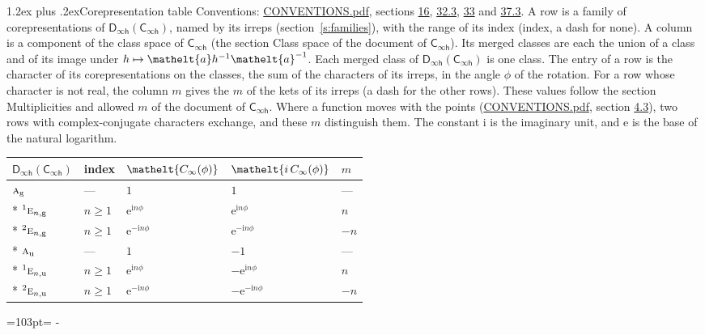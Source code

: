 \documentclass[10pt,a4paper]{article}
\makeatletter
\renewcommand\section{\@startsection{section}{1}{\z@}{-3ex plus -1ex minus -.2ex}%
  {1.2ex plus .2ex}{\normalfont\large\sffamily\bfseries\color{parttitle}}}
\newcommand{\needspace}[1]{\par\penalty-100\begingroup\dimen0=#1\relax\dimen2=\pagegoal
  \advance\dimen2-\pagetotal\ifdim\dimen0>\dimen2\relax\ifdim\dimen2>0pt\vfil\break\fi\fi
  \endgroup}
\numberwithin{equation}{section}
\newcommand{\eltfont}[1]{{\let\sigma\eltsigma\mathelt{#1}}}
\newcommand{\grp}[1]{\mathsf{#1}}
\newcommand{\irr}[1]{\text{\normalfont\scshape #1}}
\newcommand{\conjpair}[1]{{}^{#1}}
\newcommand{\comp}[1]{\eltfont{#1}}
\newcommand{\elt}[1]{\eltfont{#1}}
\newcommand{\ptag}[1]{\mathrm{#1}}
\newcommand{\iunit}{\mathrm{i}}
\newcommand{\expe}{\mathrm{e}}
\makeatother
\begin{document}
\section{Corepresentation table}\label{s:character_table}
Conventions: \href{../../CONVENTIONS.pdf}{CONVENTIONS.pdf}, sections \href{../../../rotation/CONVENTIONS.pdf\#conv.16}{16}, \href{../../CONVENTIONS.pdf\#conv.32.3}{32.3}, \href{../../CONVENTIONS.pdf\#conv.33}{33} and \href{../../CONVENTIONS.pdf\#conv.37.3}{37.3}.
A row is a family of corepresentations of $\grp{D_{\infty h}}(\grp{C_{\infty h}})$, named by its irreps (section~\ref{s:families}), with the range of its index (index, a dash for none). A column is a component of the class space of $\grp{C_{\infty h}}$ (the section Class space of the document of \href{../../../rotation/data/pdf/Cinfh.pdf}{$\grp{C_{\infty h}}$}). Its merged classes are each the union of a class and of its image under $h \mapsto \elt{a} h^{-1} \elt{a}^{-1}$. Each merged class of $\grp{D_{\infty h}}(\grp{C_{\infty h}})$ is one class. The entry of a row is the character of its corepresentations on the classes, the sum of the characters of its irreps, in the angle $\phi$ of the rotation. For a row whose character is not real, the column $m$ gives the $m$ of the kets of its irreps (a dash for the other rows). These values follow the section Multiplicities and allowed $m$ of the document of \href{../../../rotation/data/pdf/Cinfh.pdf}{$\grp{C_{\infty h}}$}. Where a function moves with the points (\href{../../CONVENTIONS.pdf}{CONVENTIONS.pdf}, section \href{../../../rotation/CONVENTIONS.pdf\#conv.4.3}{4.3}), two rows with complex-conjugate characters exchange, and these $m$ distinguish them.
The constant $\iunit$ is the imaginary unit, and $\expe$ is the base of the natural logarithm.
{\small\begin{longtable}{@{}lllll@{}}\toprule
$\grp{D_{\infty h}}(\grp{C_{\infty h}})$ & index & $\comp{C_{\infty}(\phi)}$ & $\comp{i\,C_{\infty}(\phi)}$ & $m$\\\midrule\endhead
\bottomrule\endfoot\endlastfoot
$\irr{a}_{\ptag{g}}$ & --- & $1$ & $1$ & ---\\*
$\conjpair{1}\irr{e}_{n,\ptag{g}}$ & $n \ge 1$ & $\expe^{\iunit n\phi}$ & $\expe^{\iunit n\phi}$ & $n$\\*
$\conjpair{2}\irr{e}_{n,\ptag{g}}$ & $n \ge 1$ & $\expe^{-\iunit n\phi}$ & $\expe^{-\iunit n\phi}$ & $-n$\\*
$\irr{a}_{\ptag{u}}$ & --- & $1$ & $-1$ & ---\\*
$\conjpair{1}\irr{e}_{n,\ptag{u}}$ & $n \ge 1$ & $\expe^{\iunit n\phi}$ & $-\expe^{\iunit n\phi}$ & $n$\\*
$\conjpair{2}\irr{e}_{n,\ptag{u}}$ & $n \ge 1$ & $\expe^{-\iunit n\phi}$ & $-\expe^{-\iunit n\phi}$ & $-n$\\
\bottomrule\end{longtable}}
\needspace{103pt}
\end{document}
